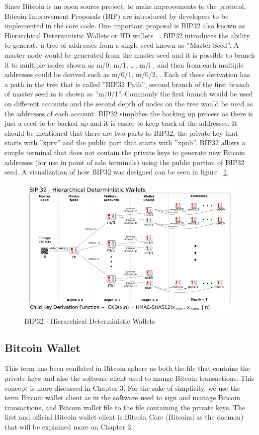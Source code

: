 Since Bitcoin is an open source project, to make improvements to the protocol, Bitcoin Improvement Proposals (BIP) are introduced by developers to be implemented in the core code. One important proposal is BIP32 also known as Hierarchical Deterministic Wallets or HD wallets ~\cite{bip32}. BIP32 introduces the ability to generate a tree of addresses from a single seed known as ''Master Seed''. A master node would be generated from the master seed and it is possible to branch it to multiple nodes shown as m/0, m/1, \dots, m/i , and then from each multiple addresses could be derived such as m/0/1, m/0/2, \etc. Each of these derivation has a path in the tree that is called ''BIP32 Path'', \eg second branch of the first branch of master seed m is shown as ''m/0/1''. Commonly the first branch would be used on different accounts and the second depth of nodes on the tree would be used as the addresses of each account. BIP32 simplifies the backing up process as there is just a seed to be backed up and it is easier to keep track of the addresses. It should be mentioned that there are two parts to BIP32, the private key that starts with ''xprv'' and the public part that starts with ''xpub''. BIP32 allows a simple terminal that does not contain the private keys to generate new Bitcoin addresses (for use in point of sale terminals) using the public portion of BIP32 seed. A visualization of how BIP32 was designed can be seen in figure ~\ref{fig:bip32}.

\begin{figure}
\centering
\includegraphics[width=\linewidth]{fig/bip32derivation.png}
  \caption{BIP32 - Hierarchical Deterministic Wallets ~\cite{bip32proposal}}
\label{fig:bip32}
\end{figure}


\subsection{Bitcoin Wallet}
This term has been conflated in Bitcoin sphere as both the file that contains the private keys and also the software client used to mange Bitcoin transactions. This concept is more discussed in Chapter 3. For the sake of simplicity, we use the term Bitcoin wallet client as in the software used to sign and manage Bitcoin transactions, and Bitcoin wallet file to the file containing the private keys.
The first and official Bitcoin wallet client is Bitcoin Core (Bitcoind as the daemon) that will be explained more on Chapter 3.


